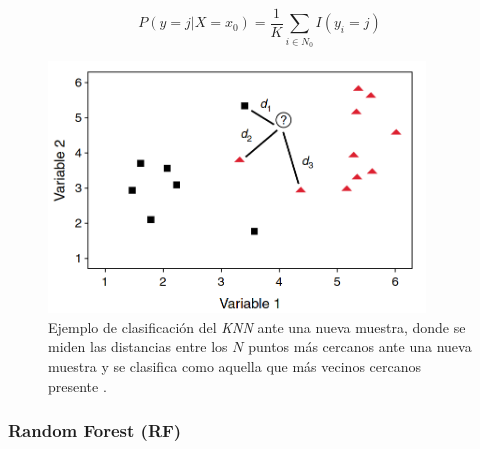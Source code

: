 \documentclass{uathesis-es}
\begin{document}
	\[
	P(y = j | X = x_0)  = \frac{1}{K} \sum_{i\in N_0} I(y_i = j)
	\]
	
	\begin{figure}[H]
		\centering
		\includegraphics[width=10cm]{Figures/Background/KNN.png}
		\caption{Ejemplo de clasificación del \textit{KNN} ante una nueva muestra, donde se miden las distancias entre los $N$ puntos más cercanos ante una nueva muestra y se clasifica como aquella que más vecinos cercanos presente \cite{VIDUEIRAFERREIRA2015195}.}
		\label{KNN_BACKGROUND}
	\end{figure}
	
	
	\subsubsection*{Random Forest (RF)}
	\label{RF_INTRODUCTION_TO_ENSEMBLES}
	
	
\end{document}
